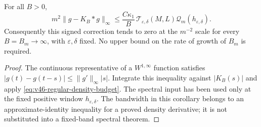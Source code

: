 \begin{corollary}
\label{cor:v46-noncritical-unsmoothing}
For all $B>0$,
\begin{equation}\label{eq:v46-noncritical-unsmoothing}
 m^2\|g-K_B*g\|_\infty
 \le\frac{C\kappa_1}{B}\,
       \mathcal T_{\varepsilon,\delta}(M,L)
                         \mathcal Q_m(h_{\varepsilon,\delta}).
\end{equation}
Consequently this signed correction tends to zero at the $m^{-2}$
scale for every $B=B_m\to\infty$, with $\varepsilon,\delta$ fixed.
No upper bound on the rate of growth of $B_m$ is required.
\end{corollary}
\begin{proof}
The continuous representative of a $W^{1,\infty}$ function satisfies
$|g(t)-g(t-s)|\le\|g'\|_\infty|s|$. Integrate this inequality against
$|K_B(s)|$ and apply \eqref{eq:v46-regular-density-budget}.
The spectral input has been used only at the fixed positive window
$h_{\varepsilon,\delta}$. The bandwidth in this corollary belongs to
an approximate-identity inequality for a proved density derivative;
it is not substituted into a fixed-band spectral theorem.
\end{proof}
